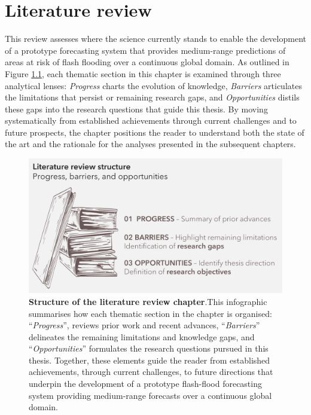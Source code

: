 \chapter{Literature review}
\label{literature_review}
\graphicspath{{chapter_02/figures}{chapter_02/tables}}


This review assesses where the science currently stands to enable the development of a prototype forecasting system that provides medium-range predictions of areas at risk of flash flooding over a continuous global domain. As outlined in Figure \ref{fig:literature_structure}, each thematic section in this chapter is examined through three analytical lenses: \textit{Progress} charts the evolution of knowledge, \textit{Barriers} articulates the limitations that persist or remaining research gaps, and \textit{Opportunities} distils these gaps into the research questions that guide this thesis. By moving systematically from established achievements through current challenges and to future prospects, the chapter positions the reader to understand both the state of the art and the rationale for the analyses presented in the subsequent chapters.

\begin{figure}[htbp]
\centering
\includegraphics[scale=1.04]{literature_structure.png}
\caption{\textbf{Structure of the literature review chapter}.This infographic summarises how each thematic section in the chapter is organised: “\textit{Progress}”, reviews prior work and recent advances, “\textit{Barriers}” delineates the remaining limitations and knowledge gaps, and “\textit{Opportunities}” formulates the research questions pursued in this thesis. Together, these elements guide the reader from established achievements, through current challenges, to future directions that underpin the development of a prototype flash-flood forecasting system providing medium-range forecasts over a continuous global domain.}
\label{fig:literature_structure}
\end{figure}



